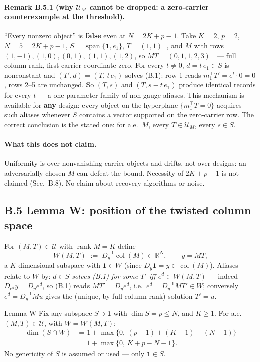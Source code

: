 \paragraph{Remark B.5.1 (why $\mathcal U_M$ cannot be dropped: a zero-carrier counterexample at the threshold).} ``Every nonzero object'' is \textbf{false} even at $N=2K+p-1$. Take $K=2$, $p=2$, $N=5=2K+p-1$, $S=\operatorname{span}\{\mathbf 1,e_1\}$, $T=(1,1)^\top$, and $M$ with rows $(1,-1),(1,0),(0,1),(1,1),(1,2)$, so $MT=(0,1,1,2,3)^\top$ --- full column rank, first carrier coordinate zero. For every $t\neq0$, $d=t\,e_1\in S$ is nonconstant and $(T',d)=(T,\,t\,e_1)$ solves (B.1): row 1 reads $m_1^\top T'=e^{t}\cdot0=0$, rows 2--5 are unchanged. So $(T,s)$ and $(T,s-t\,e_1)$ produce identical records for every $t$ --- a one-parameter family of non-gauge aliases. This mechanism is available for \textbf{any} design: every object on the hyperplane $\{m_1^\top T=0\}$ acquires such aliases whenever $S$ contains a vector supported on the zero-carrier row. The correct conclusion is the stated one: for a.e.\ $M$, every $T\in\mathcal U_M$, every $s\in S$.

\paragraph{What this does not claim.} Uniformity is over nonvanishing-carrier objects and drifts, not over designs: an adversarially chosen $M$ can defeat the bound. Necessity of $2K+p-1$ is not claimed (Sec.~B.8). No claim about recovery algorithms or noise.

\subsection{B.5 Lemma W: position of the twisted column space}

For $(M,T)\in\mathcal U$ with $\operatorname{rank}M=K$ define
\[
W(M,T)\;:=\;D_y^{-1}\operatorname{col}(M)\subset\mathbb R^N,\qquad y=MT,
\]
a $K$-dimensional subspace with $\mathbf 1\in W$ (since $D_y\mathbf 1=y\in\operatorname{col}(M)$). Aliases relate to $W$ by: \emph{$d\in S$ solves (B.1) for some $T'$ iff $e^{d}\in W(M,T)$} --- indeed $D_{e^{d}}y=D_y e^{d}$, so (B.1) reads $MT'=D_ye^{d}$, i.e.\ $e^{d}=D_y^{-1}MT'\in W$; conversely $e^{d}=D_y^{-1}Mu$ gives the (unique, by full column rank) solution $T'=u$.

\begin{namedthm}{Lemma W}
Fix any subspace $S\ni\mathbf 1$ with $\dim S=p\le N$, and $K\ge1$. For a.e.\ $(M,T)\in\mathcal U$, with $W=W(M,T)$:
\begin{equation}
\begin{aligned}
\dim(S\cap W)&=1+\max\{0,\ (p-1)+(K-1)-(N-1)\}\\
&=1+\max\{0,\,K+p-N-1\}.
\end{aligned}
\tag{B.3}
\end{equation}
No genericity of $S$ is assumed or used --- only $\mathbf 1\in S$.
\end{namedthm}

